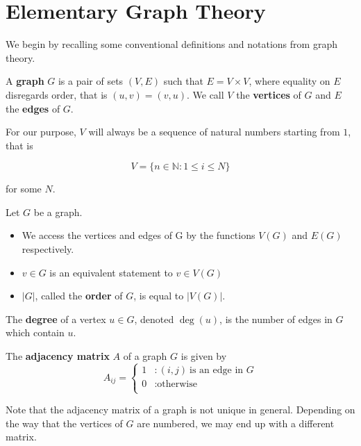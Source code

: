 \section{Elementary Graph Theory}

We begin by recalling some conventional definitions and notations from graph
theory.

\begin{definition}
  A \textbf{graph} $G$ is a pair of sets $(V,E)$ such that $E = V \times V$,
  where equality on $E$ disregards order, that is $(u,v) = (v,u)$. We call $V$
  the \textbf{vertices} of $G$ and $E$ the \textbf{edges} of $G$.
\end{definition}

For our purpose, $V$ will always be a sequence of natural numbers starting from
$1$, that is

\[
  V = \{ n \in \mathbb{N} : 1 \leq i \leq N \}
\]

for some $N$.

\begin{remark}[Notation]
  Let $G$ be a graph.

  \begin{itemize}
  \item We access the vertices and edges of G by the functions $V(G)$ and $E(G)$
    respectively.
  \item $v \in G$ is an equivalent statement to $v \in V(G)$
  \item $|G|$, called the \textbf{order} of $G$, is equal to $|V(G)|$.
  \end{itemize}
\end{remark}

\begin{definition}
  The \textbf{degree} of a vertex $u \in G$, denoted $\deg (u)$, is the number
  of edges in $G$ which contain $u$.
\end{definition}

\begin{definition}
  The \textbf{adjacency matrix} $A$ of a graph $G$ is given by
  \[
    A_{ij} = \begin{cases}
      1 &: (i,j) ~\text{is an edge in $G$} \\
      0 &: \text{otherwise} \\
    \end{cases}
  \]
\end{definition}

Note that the adjacency matrix of a graph is not unique in general. Depending on
the way that the vertices of $G$ are numbered, we may end up with a different
matrix.


